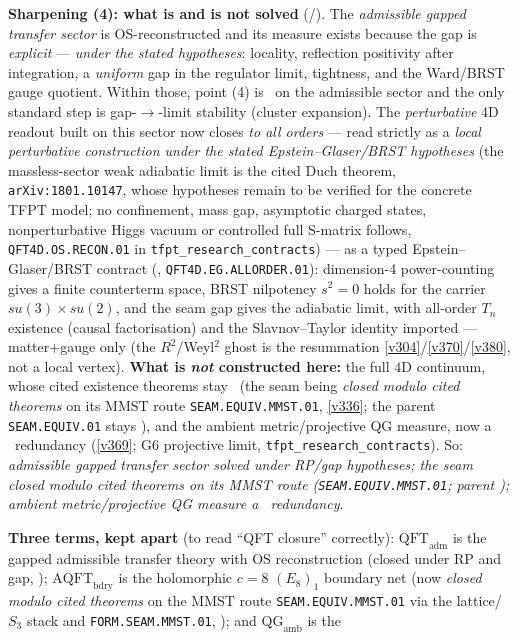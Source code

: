 \documentclass[11pt,a4paper]{article}
\theoremstyle{definition}
\begin{document}
\par\smallskip\noindent\textbf{Sharpening (4): what is and is not solved} (\mE/\mC).
The \emph{admissible gapped transfer sector} is OS-reconstructed and its measure exists because the gap is
\emph{explicit} --- \emph{under the stated hypotheses}: locality, reflection positivity after integration, a
\emph{uniform} gap in the regulator limit, tightness, and the Ward/BRST gauge quotient. Within those, point
(4) is \mE\ on the admissible sector and the only standard step is gap-$\to$-limit stability (cluster
expansion). The \emph{perturbative} 4D readout built on this sector now closes \emph{to all orders} --- read strictly as a
\emph{local perturbative construction under the stated Epstein--Glaser/BRST hypotheses} (the massless-sector weak
adiabatic limit is the cited Duch theorem, \texttt{arXiv:1801.10147}, whose hypotheses remain to be verified for the
concrete TFPT model; no confinement, mass gap, asymptotic charged states, nonperturbative Higgs vacuum or controlled
full S-matrix follows, \texttt{QFT4D.OS.RECON.01} in \texttt{tfpt\_research\_contracts}) --- as a typed
Epstein--Glaser/BRST contract (, \texttt{QFT4D.EG.ALLORDER.01}): dimension-4
power-counting gives a finite counterterm space, BRST nilpotency $s^2{=}0$ holds for the carrier $su(3){\times}su(2)$,
and the seam gap gives the adiabatic limit, with all-order $T_n$ existence (causal factorisation) and the
Slavnov--Taylor identity imported --- matter$+$gauge only (the $R^2$/Weyl$^2$ ghost is the resummation
\vref{v304}/\vref{v370}/\vref{v380}, not a local vertex). \textbf{What is \emph{not} constructed here:} the full $4$D continuum, whose cited existence theorems
stay \mO\ (the seam being \emph{closed modulo cited theorems} on its MMST route \texttt{SEAM.EQUIV.MMST.01}, \vref{v336}; the parent \texttt{SEAM.EQUIV.01} stays \mO), and the ambient metric/projective QG
measure, now a \mC\ redundancy (\vref{v369}; G6 projective limit, \texttt{tfpt\_research\_contracts}).
So: \emph{admissible gapped transfer sector solved under RP/gap hypotheses; the seam closed modulo cited theorems on
its MMST route (\texttt{SEAM.EQUIV.MMST.01}; parent \mO);
ambient metric/projective QG measure a \mC\ redundancy}.
\par\smallskip\noindent\textbf{Three terms, kept apart} (to read ``QFT closure'' correctly): $\mathrm{QFT}_{\mathrm{adm}}$
is the gapped admissible transfer theory with OS reconstruction (closed under RP and gap, \mE);
$\mathrm{AQFT}_{\mathrm{bdry}}$ is the holomorphic $c=8$ $(E_8)_1$ boundary net (now \emph{closed modulo cited
theorems} on the MMST route \texttt{SEAM.EQUIV.MMST.01} via the lattice/$S_3$ stack and \texttt{FORM.SEAM.MMST.01}, \mC); and $\mathrm{QG}_{\mathrm{amb}}$ is the
\end{document}
